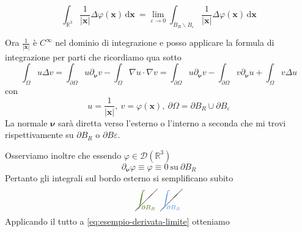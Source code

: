 \documentclass[10pt,a4paper,twoside,openright]{book}
\newcommand{\x}{\mathbf{x}}
\newcommand{\nuu}{\bm{\nu}}
\newcommand{\de}{\,\mathrm d}
\newcommand{\dxx}{\de \x}
\begin{document}
\begin{enumerate}
\begin{figure}[htpb]
\begin{tikzpicture}[x=0.75pt,y=0.75pt,yscale=-1,xscale=1]
              \end{tikzpicture}
          \end{figure}
          \FloatBarrier
          \begin{equation}
              \int _{\mathbb{R}^{3}}\frac{1}{| \x| } \Delta \varphi (\x) \dxx \ =\lim _{\varepsilon \rightarrow 0}\int _{B_{R} \backslash B_{\varepsilon }}\frac{1}{| \x| } \Delta \varphi (\x) \dxx
              \label{eq:esempio-derivata-limite}
          \end{equation}
\end{enumerate}

Ora $\displaystyle \frac{1}{| \x| }$ è $\displaystyle C^{\infty }$ nel dominio di integrazione e posso applicare la formula di integrazione per parti che ricordiamo qua sotto
\begin{equation*}
    \int _{\Omega } u\Delta v=\int _{\partial \Omega } u\partial _{\nuu} v-\int _{\Omega } \nabla u\cdotp \nabla v=\int _{\partial \Omega } u\partial _{\bm{\nu }} v-\int _{\partial \Omega } v\partial _{\bm{\nu }} u+\int _{\Omega } v\Delta u
\end{equation*}
con
\begin{equation*}
    u=\frac{1}{| \x| } ,\ v=\varphi (\x) ,\ \partial \Omega =\partial B_{R} \cup \partial B_{\varepsilon }
\end{equation*}
La normale $\displaystyle \bm{\nu }$ sarà diretta verso l'esterno o l'interno a seconda che mi trovi rispettivamente su $\displaystyle \partial B_{R}$ o $\displaystyle \partial B\varepsilon $.

Osserviamo inoltre che essendo $\displaystyle \varphi \in \mathcal{D}\left(\mathbb{R}^{3}\right)$
\begin{equation*}
    \partial _{\bm{\nu }} \varphi \equiv \varphi \equiv 0\ \text{su} \ \partial B_{R}
\end{equation*}
Pertanto gli integrali sul bordo esterno si semplificano subito
\begin{equation*}
    \cancel{\textcolor[rgb]{0.25,0.46,0.02}{\int _{\partial B_{R}}}} \ \ \cancel{\textcolor[rgb]{0.29,0.56,0.89}{\int _{\partial B_{R}}}}
\end{equation*}
Applicando il tutto a \eqref{eq:esempio-derivata-limite} otteniamo
\end{document}
